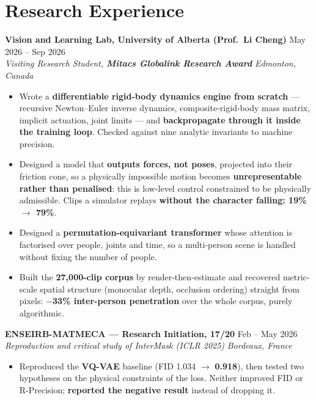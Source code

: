 \documentclass[10pt, letterpaper]{article}
\newcommand{\entry}[4]{%
  \noindent \textbf{#1} \hfill #2 \\
  \textit{#3} \hfill \textit{#4} \par
}
\begin{document}
\section{Research Experience}

\entry{Vision and Learning Lab, University of Alberta (Prof.\ Li Cheng)}{May 2026 -- Sep 2026}%
{Visiting Research Student, \textbf{Mitacs Globalink Research Award}}{Edmonton, Canada}
\begin{itemize}
    \item Wrote a \textbf{differentiable rigid-body dynamics engine from scratch} --- recursive Newton--Euler inverse dynamics, composite-rigid-body mass matrix, implicit actuation, joint limits --- and \textbf{backpropagate through it inside the training loop}. Checked against nine analytic invariants to machine precision.
    \item Designed a model that \textbf{outputs forces, not poses}, projected into their friction cone, so a physically impossible motion becomes \textbf{unrepresentable rather than penalised}: this is low-level control constrained to be physically admissible. Clips a simulator replays \textbf{without the character falling: 19\% $\to$ 79\%}.
    \item Designed a \textbf{permutation-equivariant transformer} whose attention is factorised over people, joints and time, so a multi-person scene is handled without fixing the number of people.
    \item Built the \textbf{27{,}000-clip corpus} by render-then-estimate and recovered metric-scale spatial structure (monocular depth, occlusion ordering) straight from pixels: \textbf{$-$33\% inter-person penetration} over the whole corpus, purely algorithmic.
\end{itemize}

\vspace{1pt}

\entry{ENSEIRB-MATMECA --- Research Initiation, 17/20}{Feb -- May 2026}%
{Reproduction and critical study of \textit{InterMask} (ICLR 2025)}{Bordeaux, France}
\begin{itemize}
    \item Reproduced the \textbf{VQ-VAE} baseline (FID 1.034 $\to$ \textbf{0.918}), then tested two hypotheses on the physical constraints of the loss. Neither improved FID or R-Precision; \textbf{reported the negative result} instead of dropping it.
\end{itemize}
\end{document}
